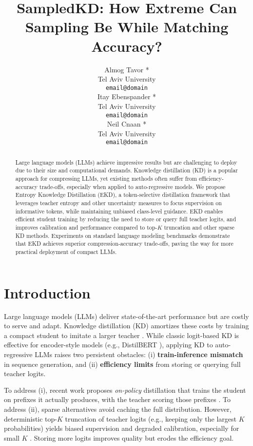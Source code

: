 \documentclass[11pt]{article}
\title{SampledKD: How Extreme Can Sampling Be While Matching Accuracy?}
\author{Almog Tavor *\\
  Tel Aviv University \\
  \texttt{email@domain} \\\And
  Itay Ebenspander *\\
  Tel Aviv University \\
  \texttt{email@domain} \\\And
  Neil Cnaan *\\
  Tel Aviv University \\
  \texttt{email@domain} \\
  }
\begin{document}
\maketitle
\let\thefootnote\relax{}
\begin{abstract}
Large language models (LLMs) achieve impressive results but are challenging to deploy due to their size and computational demands. Knowledge distillation (KD) is a popular approach for compressing LLMs, yet existing methods often suffer from efficiency-accuracy trade-offs, especially when applied to auto-regressive models. We propose Entropy Knowledge Distillation (EKD), a token-selective distillation framework that leverages teacher entropy and other uncertainty measures to focus supervision on informative tokens, while maintaining unbiased class-level guidance. EKD enables efficient student training by reducing the need to store or query full teacher logits, and improves calibration and performance compared to top-$K$ truncation and other sparse KD methods. Experiments on standard language modeling benchmarks demonstrate that EKD achieves superior compression-accuracy trade-offs, paving the way for more practical deployment of compact LLMs.
\end{abstract}

\section{Introduction}

Large language models (LLMs) deliver state-of-the-art performance but are costly to serve and adapt. Knowledge distillation (KD) amortizes these costs by training a compact student to imitate a larger teacher \citep{hinton2015distillation}. While classic logit-based KD is effective for encoder-style models (e.g., DistilBERT \citep{sanh2019distilbert}), applying KD to auto-regressive LLMs raises two persistent obstacles: (i) \textbf{train-inference mismatch} in sequence generation, and (ii) \textbf{efficiency limits} from storing or querying full teacher logits.

To address (i), recent work proposes \emph{on-policy} distillation that trains the student on prefixes it actually produces, with the teacher scoring those prefixes \citep{agarwal2024gkd}. To address (ii), sparse alternatives avoid caching the full distribution. However, deterministic top-$K$ truncation of teacher logits (e.g., keeping only the largest $K$ probabilities) yields biased supervision and degraded calibration, especially for small $K$ \citep{anshumann2025sparse,shum2024first}. Storing more logits improves quality but erodes the efficiency goal.
\end{document}
